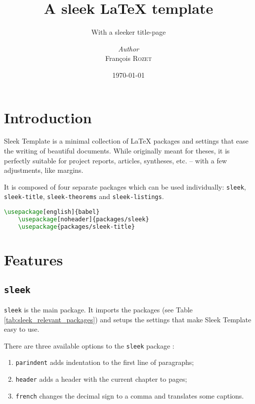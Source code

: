 \documentclass[a4paper, 12pt]{report}
\institute{Random University}
\title{A sleek \LaTeX{} template}
\subtitle{With a sleeker title-page}
\author{\textit{Author}\\François \textsc{Rozet}}
\date{\today}
\begin{document}
    \maketitle
    \romantableofcontents

    \chapter{Introduction}

    Sleek Template is a minimal collection of \LaTeX{} packages and settings that ease the writing of beautiful documents. While originally meant for theses, it is perfectly suitable for project reports, articles, syntheses, etc. -- with a few adjustments, like margins.

    It is composed of four separate packages which can be used individually: \texttt{sleek}, \texttt{sleek-title}, \texttt{sleek-theorems} and \texttt{sleek-listings}.

    \begin{lstlisting}[style=ruled, language=latex, caption={Example of Sleek Template packages usage.}, gobble=4]
    \usepackage[english]{babel}
    \usepackage[noheader]{packages/sleek}
    \usepackage{packages/sleek-title}
    \end{lstlisting}


    \chapter{Features}

    \section{\texttt{sleek}}

    \texttt{sleek} is the main package. It imports the packages (see Table \ref{tab:sleek_relevant_packages}) and setups the settings that make Sleek Template easy to use.

    There are three available options to the \texttt{sleek} package :

    \begin{enumerate}[noitemsep]
        \item \texttt{parindent} adds indentation to the first line of paragraphs;
        \item \texttt{header} adds a header with the current chapter to pages;
        \item \texttt{french} changes the decimal sign to a comma and translates some captions.
    \end{enumerate}
\end{document}
